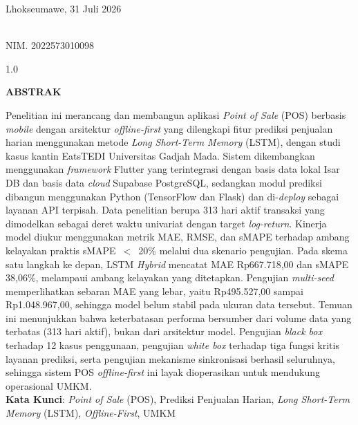 \documentclass[12pt, a4paper, onecolumn, oneside]{report}
\begin{document}
\begin{flushright}
Lhokseumawe, 31 Juli 2026

\vspace{2cm}

\\
NIM. 2022573010098
\end{flushright}

\clearpage
{}
{}
\begin{spacing}{1.0}
\begin{center}
    \textbf{ABSTRAK}\\[0.5cm]
\end{center}

\noindent Penelitian ini merancang dan membangun aplikasi \textit{Point of Sale} (POS) berbasis \textit{mobile} dengan arsitektur \textit{offline-first} yang dilengkapi fitur prediksi penjualan harian menggunakan metode \textit{Long Short-Term Memory} (LSTM), dengan studi kasus kantin EatsTEDI Universitas Gadjah Mada. Sistem dikembangkan menggunakan \textit{framework} Flutter yang terintegrasi dengan basis data lokal Isar DB dan basis data \textit{cloud} Supabase PostgreSQL, sedangkan modul prediksi dibangun menggunakan Python (TensorFlow dan Flask) dan di-\textit{deploy} sebagai layanan API terpisah. Data penelitian berupa 313 hari aktif transaksi yang dimodelkan sebagai deret waktu univariat dengan target \textit{log-return}. Kinerja model diukur menggunakan metrik MAE, RMSE, dan sMAPE terhadap ambang kelayakan praktis sMAPE~$<$~20\% melalui dua skenario pengujian. Pada skema satu langkah ke depan, LSTM \textit{Hybrid} mencatat MAE Rp667.718,00 dan sMAPE 38,06\%, melampaui ambang kelayakan yang ditetapkan. Pengujian \textit{multi-seed} memperlihatkan sebaran MAE yang lebar, yaitu Rp495.527,00 sampai Rp1.048.967,00, sehingga model belum stabil pada ukuran data tersebut. Temuan ini menunjukkan bahwa keterbatasan performa bersumber dari volume data yang terbatas (313 hari aktif), bukan dari arsitektur model. Pengujian \textit{black box} terhadap 12 kasus penggunaan, pengujian \textit{white box} terhadap tiga fungsi kritis layanan prediksi, serta pengujian mekanisme sinkronisasi berhasil seluruhnya, sehingga sistem POS \textit{offline-first} ini layak dioperasikan untuk mendukung operasional UMKM.\\[0.6cm]

\noindent \textbf{Kata Kunci}: \textit{Point of Sale} (POS), Prediksi Penjualan Harian, \textit{Long Short-Term Memory} (LSTM), \textit{Offline-First}, UMKM
\end{spacing}
\end{document}
